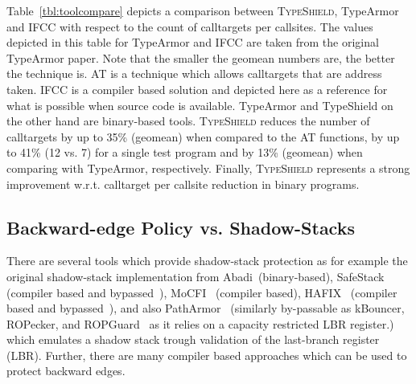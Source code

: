 Table~\ref{tbl:toolcompare} depicts 
a comparison between \textsc{TypeShield}, TypeArmor and IFCC with respect to the count of calltargets per callsites. 
The values depicted in this table for TypeArmor and IFCC are taken from the original TypeArmor paper.
Note that the smaller the geomean numbers are, the better the technique is. AT is a technique which allows calltargets that are address taken. 
IFCC is a compiler based solution and depicted here as a reference for what is possible when 
source code is available. TypeArmor and TypeShield on the other hand are binary-based tools. 
\textsc{TypeShield} reduces the number of calltargets by up to 35\% (geomean) when 
compared to the AT functions, by up to 41\% (12 vs. 7) for a single test program and by 13\% (geomean) 
when comparing with TypeArmor, respectively.
Finally, \textsc{TypeShield} represents a strong improvement w.r.t. calltarget per callsite reduction in binary programs.

\subsection{Backward-edge Policy vs. Shadow-Stacks}
\label{RQ10: Comparison with SafeStack}
There are several tools which provide shadow-stack protection as for example 
the original shadow-stack implementation from Abadi~\cite{abadi:cfi2}(binary-based), SafeStack~\cite{volodymyr:cpi} (compiler based and bypassed~\cite{safestack:bypassing}), 
MoCFI~\cite{mcfi:niu} (compiler based), HAFIX~\cite{hafix} (compiler based and bypassed~\cite{hafix:bypass}), and 
also PathArmor~\cite{veen:cfi} (similarly by-passable as kBouncer, ROPecker, and ROPGuard~\cite{schuster:raid} as it relies on a capacity restricted LBR register.)
which emulates a shadow stack trough validation of the last-branch register (LBR).
Further, there are many compiler based approaches which can be used to protect backward edges. 

